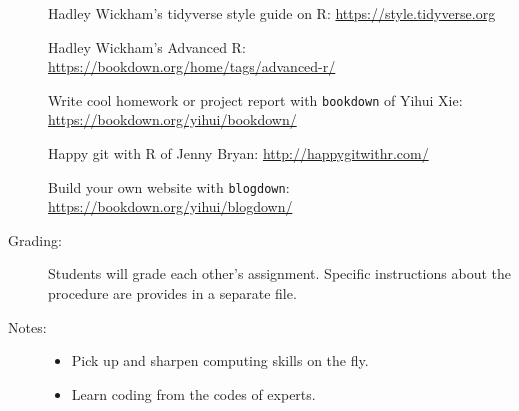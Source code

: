 \documentclass[11pt]{article}
\begin{document}
\begin{description}
Hadley Wickham's tidyverse style guide on R:
\url{https://style.tidyverse.org}

Hadley Wickham's Advanced R:
\url{https://bookdown.org/home/tags/advanced-r/}
  
Write cool homework or project report with \texttt{bookdown} of Yihui Xie:
\url{https://bookdown.org/yihui/bookdown/}

Happy git with R of Jenny Bryan:
\url{http://happygitwithr.com/}

Build your own website with \texttt{blogdown}:
\url{https://bookdown.org/yihui/blogdown/}


\item[Grading:] Students will grade each other's assignment.
Specific instructions about the procedure are provides in a separate file.

\item[Notes:] 
  \begin{itemize}
  \item Pick up and sharpen computing skills on the fly. %
  \item Learn coding from the codes of experts. %
  \end{itemize}

\end{description}
\end{document}
